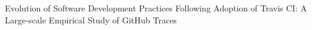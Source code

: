 \documentclass{article}
\begin{document}
Evolution of Software Development Practices 
Following Adoption of Travis CI: 
A Large-scale Empirical Study of GitHub Traces
\end{document}
